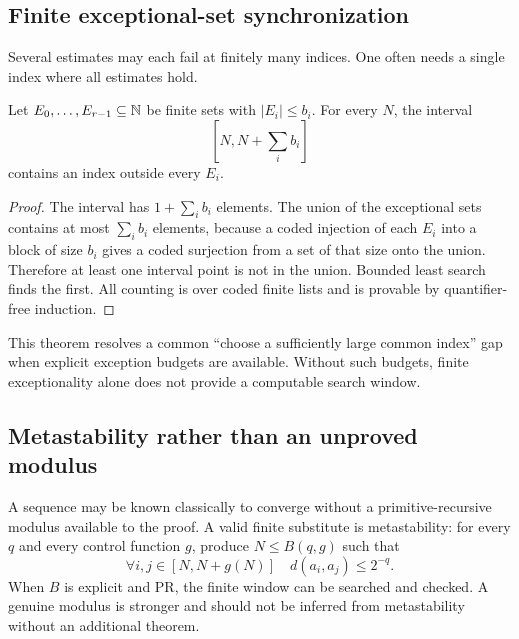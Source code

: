 \subsection{Finite exceptional-set synchronization}

Several estimates may each fail at finitely many indices.  One often needs a
single index where all estimates hold.

\begin{theorem}\label{thm:common-window}
Let \(E_0,\ldots,E_{r-1}\subseteq\mathbb N\) be finite sets with
\(|E_i|\le b_i\).  For every \(N\), the interval
\[
       [N,N+\textstyle\sum_i b_i]
\]
contains an index outside every \(E_i\).
\end{theorem}

\begin{proof}
The interval has \(1+\sum_i b_i\) elements.  The union of the exceptional sets
contains at most \(\sum_i b_i\) elements, because a coded injection of each
\(E_i\) into a block of size \(b_i\) gives a coded surjection from a set of that
size onto the union.  Therefore at least one interval point is not in the
union.  Bounded least search finds the first.  All counting is over coded finite
lists and is provable by quantifier-free induction.
\end{proof}

This theorem resolves a common ``choose a sufficiently large common index''
gap when explicit exception budgets are available.  Without such budgets,
finite exceptionality alone does not provide a computable search window.

\subsection{Metastability rather than an unproved modulus}

A sequence may be known classically to converge without a primitive-recursive
modulus available to the proof.  A valid finite substitute is metastability:
for every \(q\) and every control function \(g\), produce \(N\le B(q,g)\) such
that
\[
    \forall i,j\in[N,N+g(N)]\quad d(a_i,a_j)\le2^{-q}.
\]
When \(B\) is explicit and PR, the finite window can be searched and checked.
A genuine modulus is stronger and should not be inferred from metastability
without an additional theorem.
